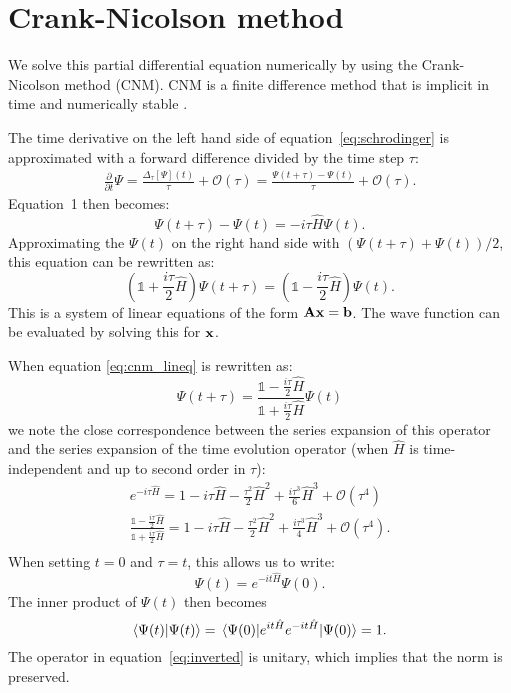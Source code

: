 \section*{Crank-Nicolson method}
We solve this partial differential equation numerically by using the Crank-Nicolson method (CNM). CNM is a finite difference method that is implicit in time and numerically stable \cite{cnm}. 

The time derivative on the left hand side of equation~\ref{eq:schrodinger} is approximated with a forward difference divided by the time step $\tau$:
\begin{gather*}
    \frac{\partial}{\partial t}\Psi 
    = \frac{\Delta_\tau[\Psi](t)}{\tau} + \mathcal{O}(\tau)
    = \frac{\Psi(t + \tau) - \Psi(t)}{\tau} + \mathcal{O}(\tau).
\end{gather*} Equation~1 then becomes:
\[
    \Psi(t+\tau)-\Psi(t) 
    = -i\tau\hat{H}\Psi(t).
\] Approximating the $\Psi(t)$ on the right hand side with $\left(\Psi(t+\tau)+\Psi(t)\right)/2$, this equation can be rewritten as:
\begin{equation}\label{eq:cnm_lineq}
    \left(\mathbb{1}+\frac{i\tau}{2}\hat{H}\right)\Psi(t+\tau) 
    = \left(\mathbb{1}-\frac{i\tau}{2}\hat{H}\right)\Psi(t).
\end{equation} This is a system of linear equations of the form $\mathbf{A}\vb{x}=\vb{b}$. The wave function can be evaluated by solving this for $\vb{x}$. 

When equation \ref{eq:cnm_lineq} is rewritten as:
\begin{equation}\label{eq:inverted}
\Psi(t+\tau) 
    = \frac{\mathbb{1}-\frac{i\tau}{2}\hat{H}}{\mathbb{1}+\frac{i\tau}{2}\hat{H}}\Psi(t)
\end{equation} we note the close correspondence between the series expansion of this operator and the series expansion of the time evolution operator (when $\hat{H}$ is time-independent and up to second order in $\tau$):
\begin{gather*}
    e^{-i\tau\hat{H}} 
    = 1 - i \tau\hat{H} - \frac{\tau^2}{2}\hat{H}^2 + \frac{i\tau^3}{6}\hat{H}^3 + \mathcal{O}(\tau^4)\\
    \frac{\mathbb{1}-\frac{i\tau}{2}\hat{H}}{\mathbb{1}+\frac{i\tau}{2}\hat{H}} 
    = 1 - i \tau\hat{H} - \frac{\tau^2}{2}\hat{H}^2 + \frac{i\tau^3}{4}\hat{H}^3 + \mathcal{O}(\tau^4).\\
\end{gather*}
When setting $t=0$ and $\tau=t$, this allows us to write:
\[
    \Psi(t)
    = e^{-it \hat{H}} \Psi(0).
\] The inner product of $\Psi(t)$ then becomes
\[
    \braket{\Psi(t)}{\Psi(t)}
    = \ev*{e^{it\hat{H}} e^{-it\hat{H}}}{\Psi(0)}
    = 1.
\] The operator in equation~\ref{eq:inverted} is unitary, which implies that the norm is preserved.

